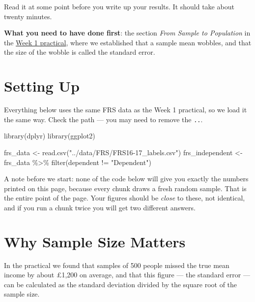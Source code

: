 \documentclass[
  letterpaper,
  DIV=11,
  numbers=noendperiod]{scrreprt}
\newenvironment{Shaded}{\begin{snugshade}}{\end{snugshade}}
\newcommand{\FunctionTok}[1]{\textcolor[rgb]{0.28,0.35,0.67}{#1}}
\newcommand{\NormalTok}[1]{\textcolor[rgb]{0.00,0.23,0.31}{#1}}
\newcommand{\OtherTok}[1]{\textcolor[rgb]{0.00,0.23,0.31}{#1}}
\newcommand{\SpecialCharTok}[1]{\textcolor[rgb]{0.37,0.37,0.37}{#1}}
\newcommand{\StringTok}[1]{\textcolor[rgb]{0.13,0.47,0.30}{#1}}
\newcounter{none} %
\begin{document}
Read it at some point before you write up your results. It should take
about twenty minutes.

\textbf{What you need to have done first}: the section \emph{From Sample
to Population} in the
\href{https://gdsl-ul.github.io/stats/labs/01.DataExploration.html}{Week
1 practical}, where we established that a sample mean wobbles, and that
the size of the wobble is called the standard error.

\section*{Setting Up}\label{setting-up}


Everything below uses the same FRS data as the Week 1 practical, so we
load it the same way. Check the path --- you may need to remove the
\texttt{..}.

\begin{Shaded}
\begin{Highlighting}[]
\FunctionTok{library}\NormalTok{(dplyr)}
\FunctionTok{library}\NormalTok{(ggplot2)}

\NormalTok{frs\_data }\OtherTok{\textless{}{-}} \FunctionTok{read.csv}\NormalTok{(}\StringTok{"../data/FRS/FRS16{-}17\_labels.csv"}\NormalTok{)}
\NormalTok{frs\_independent }\OtherTok{\textless{}{-}}\NormalTok{ frs\_data }\SpecialCharTok{\%\textgreater{}\%} \FunctionTok{filter}\NormalTok{(dependent }\SpecialCharTok{!=} \StringTok{"Dependent"}\NormalTok{)}
\end{Highlighting}
\end{Shaded}

A note before we start: none of the code below will give you exactly the
numbers printed on this page, because every chunk draws a fresh random
sample. That is the entire point of the page. Your figures should be
\emph{close} to these, not identical, and if you run a chunk twice you
will get two different answers.

\section*{Why Sample Size Matters}\label{why-sample-size-matters}


In the practical we found that samples of 500 people missed the true
mean income by about £1,200 on average, and that this figure --- the
standard error --- can be calculated as the standard deviation divided
by the square root of the sample size.
\end{document}
